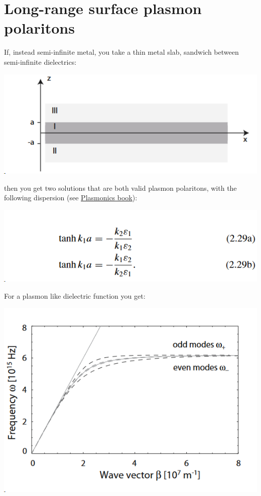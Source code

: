 \documentclass[11pt]{article}
\begin{document}
\section{Long-range surface plasmon polaritons}
\label{sec:org0cc5b40}


If, instead semi-infinite metal, you take a thin metal slab,
sandwich between semi-infinite dielectrics:


\begin{center}
\includegraphics[width=.9\linewidth]{Long-range_surface_plasmon_polaritons/2023-08-25_20-54-57_screenshot.png}
\end{center}


then you get two solutions that are both valid plasmon polaritons, with
the following dispersion (see \href{./Plasmonics-book.pdf}{Plasmonics book}):



\begin{center}
\includegraphics[width=.9\linewidth]{Long-range_surface_plasmon_polaritons/2023-08-25_21-22-38_screenshot.png}
\end{center}






For a plasmon like dielectric function you get:


\begin{center}
\includegraphics[width=.9\linewidth]{Long-range_surface_plasmon_polaritons/2023-08-25_21-27-24_screenshot.png}
\end{center}
\end{document}
